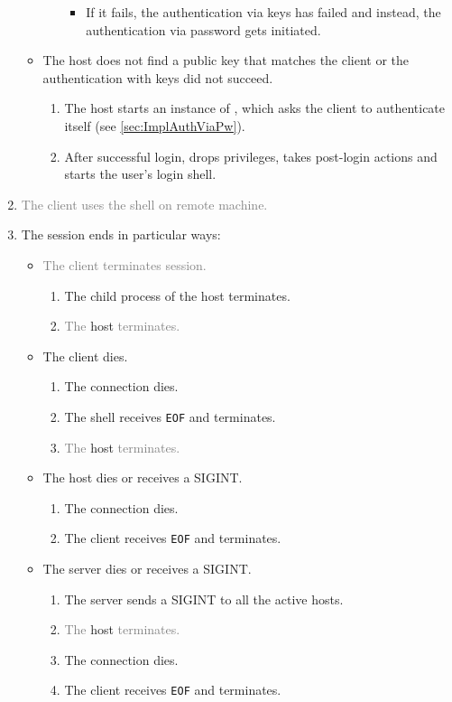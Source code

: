 \documentclass[10pt,a4paper,titlepage,twoside,english,final]{zhawreprt}
\begin{document}
\begin{enumerate}
\begin{itemize}
\begin{enumerate}
\begin{itemize}
\begin{enumerate}
			\end{enumerate}
			\item If it fails, the authentication via keys has failed and instead, the authentication via password gets initiated.
		\end{itemize}
	\end{enumerate}
	\item The host does not find a public key that matches the client or the authentication with keys did not succeed.
	\begin{enumerate}
		\item The host starts an instance of \cite{login}, which asks the client to authenticate itself (see \ref{sec:ImplAuthViaPw}).
		\item After successful \gls{login}, \cite{login} drops privileges, takes post-\gls{login} actions and starts the user's \gls{login} \gls{shell}.
	\end{enumerate}
\end{itemize}
\item \textcolor{gray}{The client uses the \gls{shell} on remote machine.}
\item The session ends in particular ways:
\begin{itemize}
	\item \textcolor{gray}{The client terminates session.}
	\begin{enumerate}
		\item The child process of the host terminates.
		\item \textcolor{gray}{The} host \textcolor{gray}{terminates.}
	\end{enumerate}
	\item The client dies.
	\begin{enumerate}
		\item The connection dies.
		\item The \gls{shell} receives \texttt{EOF} and terminates.
		\item \textcolor{gray}{The} host \textcolor{gray}{terminates.}
	\end{enumerate}
	\item The host dies or receives a \gls{SIGINT}.
	\begin{enumerate}
		\item The connection dies.
		\item The client receives \texttt{EOF} and terminates.
	\end{enumerate}
	\item The server dies or receives a \gls{SIGINT}.
	\begin{enumerate}
		\item The server sends a \gls{SIGINT} to all the active hosts.
		\item \textcolor{gray}{The} host \textcolor{gray}{terminates.}
		\item The connection dies.
		\item The client receives \texttt{EOF} and terminates.
	\end{enumerate}
\end{itemize}
\end{enumerate}
\end{document}
